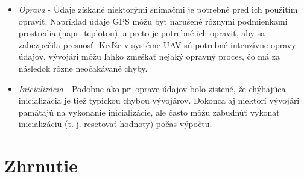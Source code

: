 \documentclass[10pt,twoside,slovak,a4paper]{article}
\begin{document}
\begin{itemize}
\item \emph{Oprava} - Údaje získané niektorými snímačmi je potrebné pred ich použitím opraviť. Napríklad údaje GPS môžu byť narušené rôznymi podmienkami prostredia (napr. teplotou), a preto je potrebné ich opraviť, aby sa zabezpečila presnosť. Keďže v systéme UAV sú potrebné intenzívne opravy údajov, vývojári môžu ľahko zmeškať nejaký opravný proces, čo má za následok rôzne neočakávané chyby.
\item \emph{Inicializácia} - Podobne ako pri oprave údajov bolo zistené, že chýbajúca inicializácia je tiež typickou chybou vývojárov. Dokonca aj niektorí vývojári pamätajú na vykonanie inicializácie, ale často môžu zabudnúť vykonať inicializáciu (t. j. resetovať hodnoty) počas výpočtu.\cite{chybyautopilot}
\end{itemize} 

\section{Zhrnutie}


 
\end{document}
